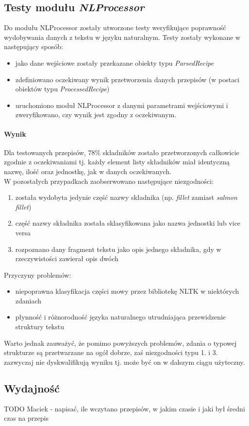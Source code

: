 \documentclass[11pt,a4paper]{article}
\begin{document}
\subsection{Testy modułu \textit{NLProcessor}}
Do modułu NLProcessor zostały utworzone testy weryfikujące poprawność wydobywania danych z tekstu w języku naturalnym. Testy zostały wykonane w następujący sposób:
\begin{itemize}
\item jako dane wejściowe zostały przekazane obiekty typu \textit{ParsedRecipe} 
\item zdefiniowano oczekiwany wynik przetworzenia danych przepisów (w postaci obiektów typu \textit{ProcessedRecipe})
\item uruchomiono moduł NLProcessor z danymi parametrami wejściowymi i zweryfikowano, czy wynik jest zgodny z oczekiwanym.  
\end{itemize}
\paragraph{Wynik} 
Dla testowanych przepisów, 78\% składników zostało przetworzonych całkowicie zgodnie z oczekiwaniami tj. każdy element listy składników miał identyczną nazwę, ilość oraz jednostkę, jak w danych oczekiwanych.\\
W pozostałych przypadkach zaobserwowano następujące niezgodności:
\begin{enumerate}
\item została wydobyta jedynie część nazwy składnika (np. \textit{fillet} zamiast \textit{salmon fillet})
\item część nazwy składnika została sklasyfikowana jako nazwa jednostki lub vice versa
\item rozpoznano dany fragment tekstu jako opis jednego składnika, gdy w rzeczywistości zawierał opis dwóch
\end{enumerate}
Przyczyny problemów:
\begin{itemize}
\item niepoprawna klasyfikacja części mowy przez bibliotekę NLTK w niektórych zdaniach
\item płynność i różnorodność języka naturalnego utrudniająca przewidzenie struktury tekstu
\end{itemize}
Warto jednak zauważyć, że pomimo powyższych problemów, zdania o typowej strukturze są przetwarzane na ogół dobrze, zaś niezgodności typu 1. i 3. zazwyczaj nie dyskwalifikują wyniku tj. może być on w dalszym ciągu użyteczny.
\subsection{Wydajność}
TODO Maciek - napisać, ile wczytano przepisów, w jakim czasie i jaki był średni czas na przepis
\end{document}
